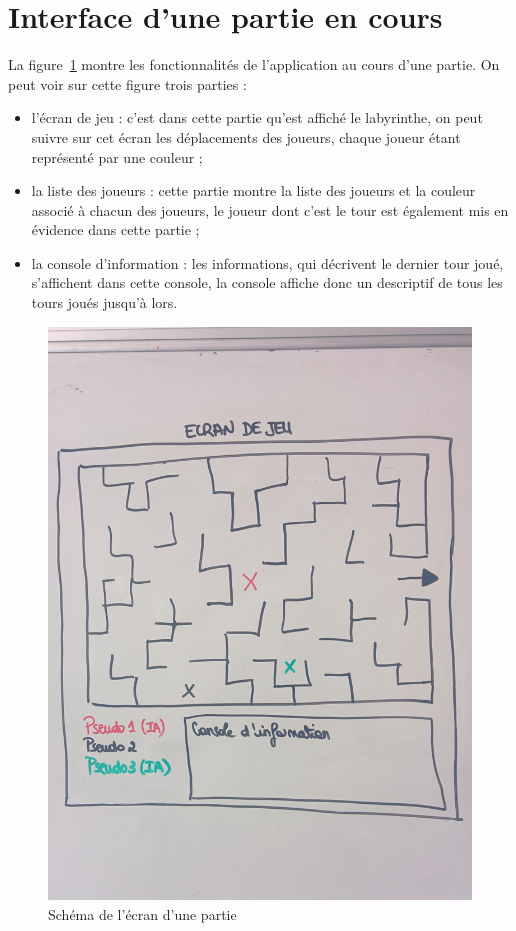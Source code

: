 \section{Interface d'une partie en cours}
La figure~\ref{fig:ecran_partie} montre les fonctionnalités de l'application au cours d'une partie. On peut voir sur cette figure trois parties :
\begin{itemize}
	\item l'écran de jeu : c'est dans cette partie qu'est affiché le labyrinthe, on peut suivre sur cet écran les déplacements des joueurs, chaque joueur étant représenté par une couleur ;
	\item la liste des joueurs : cette partie montre la liste des joueurs et la couleur associé à chacun des joueurs, le joueur dont c'est le tour est également mis en évidence dans cette partie ;
	\item la console d'information : les informations, qui décrivent le dernier tour joué, s'affichent dans cette console, la console affiche donc un descriptif de tous les tours joués jusqu'à lors.
\end{itemize}
\begin{figure}[h]
	\centering
	\includegraphics[scale=0.2]{images/schema_ecran_partie.jpg}
	\caption{Schéma de l'écran d'une partie}
	\label{fig:ecran_partie}
\end{figure}

